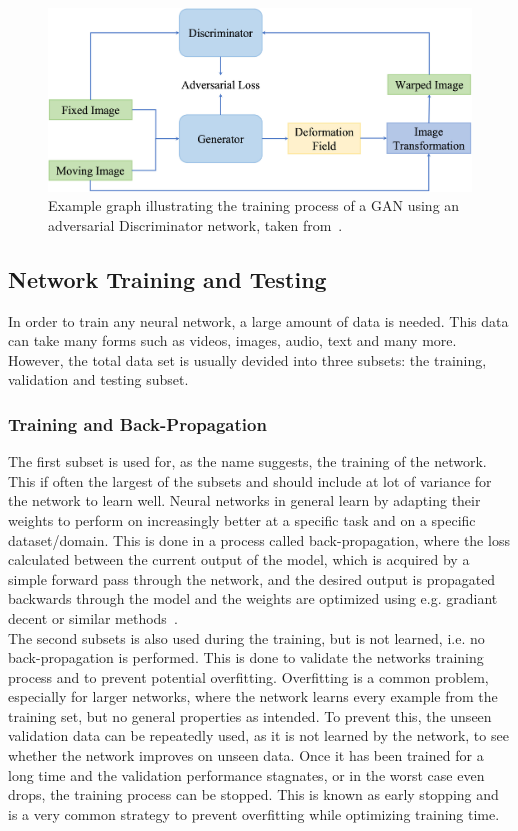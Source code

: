 \begin{figure}[h] %
	\centering
	\graphicspath{{images/}{\main/images/}}
	\includegraphics[width=\linewidth]{GANRegistrationGraph.jpg} 
	\caption{Example graph illustrating the training process of a GAN using an adversarial Discriminator network, taken from~\cite{Zou2022}.}
	\label{fig:GANRegistration}
\end{figure}

\subsection{Network Training and Testing} \label{SubSec:NetworkTrainingAndTesting}
In order to train any neural network, a large amount of data is needed. This data can take many forms such as videos, images, audio, text and many more. However, the total data set is usually devided into three subsets: the training, validation and testing subset. 

\subsubsection{Training and Back-Propagation}
The first subset is used for, as the name suggests, the training of the network. This if often the largest of the subsets and should include at lot of variance for the network to learn well. Neural networks in general learn by adapting their weights to perform on increasingly better at a specific task and on a specific dataset/domain. This is done in a process called back-propagation, where the loss calculated between the current output of the model, which is acquired by a simple forward pass through the network, and the desired output is propagated backwards through the model and the weights are optimized using e.g. gradiant decent or similar methods~\cite{CNN2}. \\
The second subsets is also used during the training, but is not learned, i.e. no back-propagation is performed. This is done to validate the networks training process and to prevent potential overfitting. Overfitting is a common problem, especially for larger networks, where the network learns every example from the training set, but no general properties as intended. To prevent this, the unseen validation data can be repeatedly used, as it is not learned by the network, to see whether the network improves on unseen data. Once it has been trained for a long time and the validation performance stagnates, or in the worst case even drops, the training process can be stopped. This is known as early stopping and is a very common strategy to prevent overfitting while optimizing training time.\\

